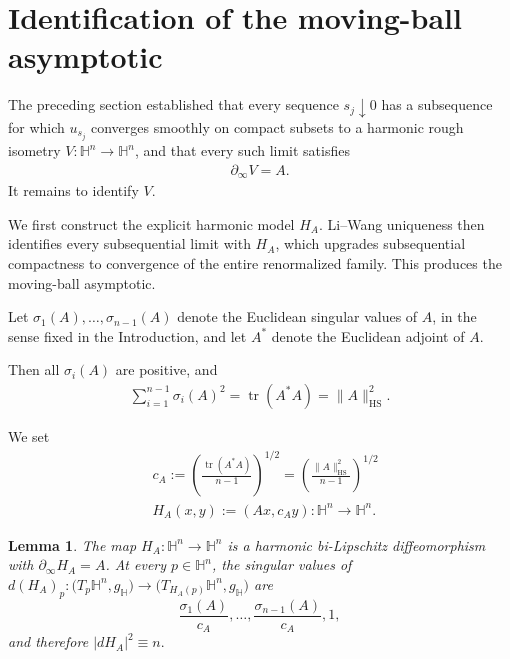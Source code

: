 \documentclass[11pt]{amsart}
\newcommand{\SuggestedDelete}[1]{{\hypersetup{linkcolor=red,citecolor=red,urlcolor=red}\color{red}#1}}
\newcommand{\ReviewUnusedLabel}[1]{%
  \par\noindent
  \SuggestedDelete{\textup{\scriptsize Unused label: \texttt{\detokenize{\label{#1}}}}}%
  \par}
\theoremstyle{plain}
\newtheorem{lemma}[theorem]{Lemma}
\theoremstyle{plain}
\theoremstyle{plain}
\newcommand{\Hn}{\mathbb H^n}
\newcommand{\bdry}{\partial_\infty}
\newcommand{\tr}{\operatorname{tr}}
\newcommand{\HS}{\mathrm{HS}}
\numberwithin{equation}{section}
\begin{document}
\section{Identification of the moving-ball asymptotic}

The preceding section established that every sequence
\(s_j\downarrow0\) has a subsequence for which \(u_{s_j}\) converges
smoothly on compact subsets to a harmonic rough isometry
\(V:\Hn\to\Hn\), and that every such limit satisfies
\begin{align}
\bdry V=A.
\nonumber
\end{align}
It remains to identify \(V\).

We first construct the explicit harmonic model \(H_A\).  Li--Wang
uniqueness then identifies every subsequential limit with \(H_A\), which
upgrades subsequential compactness to convergence of the entire
renormalized family.  This produces the moving-ball asymptotic.  


Let \(\sigma_1(A),\dots,\sigma_{n-1}(A)\) denote the Euclidean singular
values of \(A\), in the sense fixed in the Introduction, and let \(A^*\)
denote the Euclidean adjoint of \(A\).


Then all \(\sigma_i(A)\) are positive, and
\begin{align}
\sum_{i=1}^{n-1}\sigma_i(A)^2=\operatorname{tr}(A^*A)=\|A\|_{\HS}^2. \nonumber
\end{align}

We set
\begin{align}
&c_A:=\left(\frac{\tr(A^*A)}{n-1}\right)^{1/2}=\left(\frac{\|A\|_{\HS}^2}{n-1}\right)^{1/2}\label{eq:cA_def}\\
&H_A(x,y):=(Ax,c_Ay): \mathbb{H}^{n}\rightarrow\mathbb{H}^{n}.\label{eq:HA_def}
\end{align}

\begin{lemma}\label{lem:HA_harmonic}
The map \(H_A:\Hn\to\Hn\) is a harmonic bi-Lipschitz diffeomorphism with
\(\bdry H_A=A\).  At every \(p\in\mathbb H^{n}\), the singular values of $d(H_A)_p:
\bigl(T_p\mathbb H^{n},g_{\mathbb H}\bigr)
\longrightarrow
\bigl(T_{H_A(p)}\mathbb H^{n},g_{\mathbb H}\bigr)$ are
\begin{equation}\label{eq:HA_singular_values}
\frac{\sigma_1(A)}{c_A},\dots,
\frac{\sigma_{n-1}(A)}{c_A},1,
\end{equation}
and therefore $|dH_A|^2\equiv n.$
\end{lemma}
\end{document}
